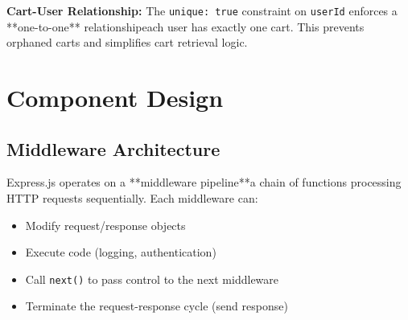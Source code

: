 \documentclass[12pt, a4paper]{report}
\begin{document}
\textbf{Cart-User Relationship:} The \texttt{unique: true} constraint on \texttt{userId} enforces a **one-to-one** relationshipeach user has exactly one cart. This prevents orphaned carts and simplifies cart retrieval logic.


\section{Component Design}

\subsection{Middleware Architecture}

Express.js operates on a **middleware pipeline**a chain of functions processing HTTP requests sequentially. Each middleware can:
\begin{itemize}
    \item Modify request/response objects
    \item Execute code (logging, authentication)
    \item Call \texttt{next()} to pass control to the next middleware
    \item Terminate the request-response cycle (send response)
\end{itemize}
\end{document}
